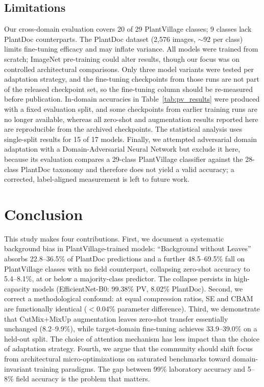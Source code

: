\documentclass[preprint,12pt]{elsarticle}
\begin{document}
\subsection{Limitations}

Our cross-domain evaluation covers 20 of 29 PlantVillage classes; 9 classes lack PlantDoc counterparts. The PlantDoc dataset (2,576 images, $\sim$92 per class) limits fine-tuning efficacy and may inflate variance. All models were trained from scratch; ImageNet pre-training could alter results, though our focus was on controlled architectural comparisons. Only three model variants were tested per adaptation strategy, and the fine-tuning checkpoints from those runs are not part of the released checkpoint set, so the fine-tuning column should be re-measured before publication. In-domain accuracies in Table~\ref{tab:pv_results} were produced with a fixed evaluation split, and some checkpoints from earlier training runs are no longer available, whereas all zero-shot and augmentation results reported here are reproducible from the archived checkpoints. The statistical analysis uses single-split results for 15 of 17 models. Finally, we attempted adversarial domain adaptation with a Domain-Adversarial Neural Network but exclude it here, because its evaluation compares a 29-class PlantVillage classifier against the 28-class PlantDoc taxonomy and therefore does not yield a valid accuracy; a corrected, label-aligned measurement is left to future work.

\section{Conclusion}
\label{sec:conclusion}

This study makes four contributions. First, we document a systematic background bias in PlantVillage-trained models: ``Background without Leaves'' absorbs 22.8--36.5\% of PlantDoc predictions and a further 48.5--69.5\% fall on PlantVillage classes with no field counterpart, collapsing zero-shot accuracy to 5.4--8.1\%, at or below a majority-class predictor. The collapse persists in high-capacity models (EfficientNet-B0: 99.38\% PV, 8.02\% PlantDoc). Second, we correct a methodological confound: at equal compression ratios, SE and CBAM are functionally identical ($<$0.04\% parameter difference). Third, we demonstrate that CutMix+MixUp augmentation leaves zero-shot transfer essentially unchanged (8.2--9.9\%), while target-domain fine-tuning achieves 33.9--39.0\% on a held-out split. The choice of attention mechanism has less impact than the choice of adaptation strategy. Fourth, we argue that the community should shift focus from architectural micro-optimizations on saturated benchmarks toward domain-invariant training paradigms. The gap between 99\% laboratory accuracy and 5--8\% field accuracy is the problem that matters.
\end{document}
